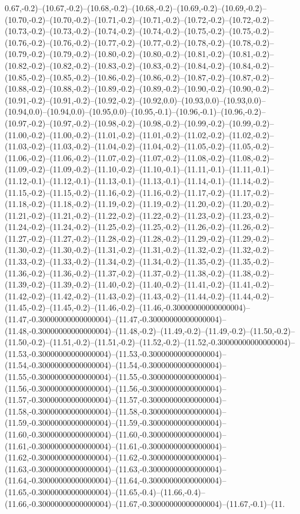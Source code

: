 0.67,-0.2)--(10.67,-0.2)--(10.68,-0.2)--(10.68,-0.2)--(10.69,-0.2)--(10.69,-0.2)--(10.70,-0.2)--(10.70,-0.2)--(10.71,-0.2)--(10.71,-0.2)--(10.72,-0.2)--(10.72,-0.2)--(10.73,-0.2)--(10.73,-0.2)--(10.74,-0.2)--(10.74,-0.2)--(10.75,-0.2)--(10.75,-0.2)--(10.76,-0.2)--(10.76,-0.2)--(10.77,-0.2)--(10.77,-0.2)--(10.78,-0.2)--(10.78,-0.2)--(10.79,-0.2)--(10.79,-0.2)--(10.80,-0.2)--(10.80,-0.2)--(10.81,-0.2)--(10.81,-0.2)--(10.82,-0.2)--(10.82,-0.2)--(10.83,-0.2)--(10.83,-0.2)--(10.84,-0.2)--(10.84,-0.2)--(10.85,-0.2)--(10.85,-0.2)--(10.86,-0.2)--(10.86,-0.2)--(10.87,-0.2)--(10.87,-0.2)--(10.88,-0.2)--(10.88,-0.2)--(10.89,-0.2)--(10.89,-0.2)--(10.90,-0.2)--(10.90,-0.2)--(10.91,-0.2)--(10.91,-0.2)--(10.92,-0.2)--(10.92,0.0)--(10.93,0.0)--(10.93,0.0)--(10.94,0.0)--(10.94,0.0)--(10.95,0.0)--(10.95,-0.1)--(10.96,-0.1)--(10.96,-0.2)--(10.97,-0.2)--(10.97,-0.2)--(10.98,-0.2)--(10.98,-0.2)--(10.99,-0.2)--(10.99,-0.2)--(11.00,-0.2)--(11.00,-0.2)--(11.01,-0.2)--(11.01,-0.2)--(11.02,-0.2)--(11.02,-0.2)--(11.03,-0.2)--(11.03,-0.2)--(11.04,-0.2)--(11.04,-0.2)--(11.05,-0.2)--(11.05,-0.2)--(11.06,-0.2)--(11.06,-0.2)--(11.07,-0.2)--(11.07,-0.2)--(11.08,-0.2)--(11.08,-0.2)--(11.09,-0.2)--(11.09,-0.2)--(11.10,-0.2)--(11.10,-0.1)--(11.11,-0.1)--(11.11,-0.1)--(11.12,-0.1)--(11.12,-0.1)--(11.13,-0.1)--(11.13,-0.1)--(11.14,-0.1)--(11.14,-0.2)--(11.15,-0.2)--(11.15,-0.2)--(11.16,-0.2)--(11.16,-0.2)--(11.17,-0.2)--(11.17,-0.2)--(11.18,-0.2)--(11.18,-0.2)--(11.19,-0.2)--(11.19,-0.2)--(11.20,-0.2)--(11.20,-0.2)--(11.21,-0.2)--(11.21,-0.2)--(11.22,-0.2)--(11.22,-0.2)--(11.23,-0.2)--(11.23,-0.2)--(11.24,-0.2)--(11.24,-0.2)--(11.25,-0.2)--(11.25,-0.2)--(11.26,-0.2)--(11.26,-0.2)--(11.27,-0.2)--(11.27,-0.2)--(11.28,-0.2)--(11.28,-0.2)--(11.29,-0.2)--(11.29,-0.2)--(11.30,-0.2)--(11.30,-0.2)--(11.31,-0.2)--(11.31,-0.2)--(11.32,-0.2)--(11.32,-0.2)--(11.33,-0.2)--(11.33,-0.2)--(11.34,-0.2)--(11.34,-0.2)--(11.35,-0.2)--(11.35,-0.2)--(11.36,-0.2)--(11.36,-0.2)--(11.37,-0.2)--(11.37,-0.2)--(11.38,-0.2)--(11.38,-0.2)--(11.39,-0.2)--(11.39,-0.2)--(11.40,-0.2)--(11.40,-0.2)--(11.41,-0.2)--(11.41,-0.2)--(11.42,-0.2)--(11.42,-0.2)--(11.43,-0.2)--(11.43,-0.2)--(11.44,-0.2)--(11.44,-0.2)--(11.45,-0.2)--(11.45,-0.2)--(11.46,-0.2)--(11.46,-0.30000000000000004)--(11.47,-0.30000000000000004)--(11.47,-0.30000000000000004)--(11.48,-0.30000000000000004)--(11.48,-0.2)--(11.49,-0.2)--(11.49,-0.2)--(11.50,-0.2)--(11.50,-0.2)--(11.51,-0.2)--(11.51,-0.2)--(11.52,-0.2)--(11.52,-0.30000000000000004)--(11.53,-0.30000000000000004)--(11.53,-0.30000000000000004)--(11.54,-0.30000000000000004)--(11.54,-0.30000000000000004)--(11.55,-0.30000000000000004)--(11.55,-0.30000000000000004)--(11.56,-0.30000000000000004)--(11.56,-0.30000000000000004)--(11.57,-0.30000000000000004)--(11.57,-0.30000000000000004)--(11.58,-0.30000000000000004)--(11.58,-0.30000000000000004)--(11.59,-0.30000000000000004)--(11.59,-0.30000000000000004)--(11.60,-0.30000000000000004)--(11.60,-0.30000000000000004)--(11.61,-0.30000000000000004)--(11.61,-0.30000000000000004)--(11.62,-0.30000000000000004)--(11.62,-0.30000000000000004)--(11.63,-0.30000000000000004)--(11.63,-0.30000000000000004)--(11.64,-0.30000000000000004)--(11.64,-0.30000000000000004)--(11.65,-0.30000000000000004)--(11.65,-0.4)--(11.66,-0.4)--(11.66,-0.30000000000000004)--(11.67,-0.30000000000000004)--(11.67,-0.1)--(11.